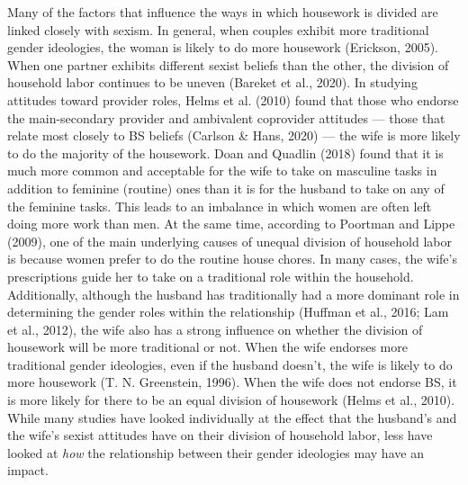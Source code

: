 \documentclass[
  man]{apa6}
\begin{document}
Many of the factors that influence the ways in which housework is divided are linked closely with sexism. In general, when couples exhibit more traditional gender ideologies, the woman is likely to do more housework (Erickson, 2005). When one partner exhibits different sexist beliefs than the other, the division of household labor continues to be uneven (Bareket et al., 2020). In studying attitudes toward provider roles, Helms et al. (2010) found that those who endorse the main-secondary provider and ambivalent coprovider attitudes --- those that relate most closely to BS beliefs (Carlson \& Hans, 2020) --- the wife is more likely to do the majority of the housework. Doan and Quadlin (2018) found that it is much more common and acceptable for the wife to take on masculine tasks in addition to feminine (routine) ones than it is for the husband to take on any of the feminine tasks. This leads to an imbalance in which women are often left doing more work than men. At the same time, according to Poortman and Lippe (2009), one of the main underlying causes of unequal division of household labor is because women prefer to do the routine house chores. In many cases, the wife's prescriptions guide her to take on a traditional role within the household. Additionally, although the husband has traditionally had a more dominant role in determining the gender roles within the relationship (Huffman et al., 2016; Lam et al., 2012), the wife also has a strong influence on whether the division of housework will be more traditional or not. When the wife endorses more traditional gender ideologies, even if the husband doesn't, the wife is likely to do more housework (T. N. Greenstein, 1996). When the wife does not endorse BS, it is more likely for there to be an equal division of housework (Helms et al., 2010). While many studies have looked individually at the effect that the husband's and the wife's sexist attitudes have on their division of household labor, less have looked at \emph{how} the relationship between their gender ideologies may have an impact.
\end{document}
